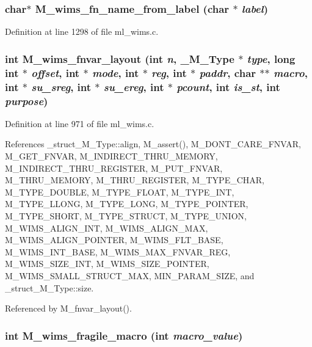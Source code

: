 \subsubsection{\setlength{\rightskip}{0pt plus 5cm}char$\ast$ M\_\-wims\_\-fn\_\-name\_\-from\_\-label (char $\ast$ {\em label})}\label{m__wims_8h_21169e6a1c9a19297104e104b42b11f3}




Definition at line 1298 of file ml\_\-wims.c.
\subsubsection{\setlength{\rightskip}{0pt plus 5cm}int M\_\-wims\_\-fnvar\_\-layout (int {\em n}, \bf{\_\-M\_\-Type} $\ast$ {\em type}, long int $\ast$ {\em offset}, int $\ast$ {\em mode}, int $\ast$ {\em reg}, int $\ast$ {\em paddr}, char $\ast$$\ast$ {\em macro}, int $\ast$ {\em su\_\-sreg}, int $\ast$ {\em su\_\-ereg}, int $\ast$ {\em pcount}, int {\em is\_\-st}, int {\em purpose})}\label{m__wims_8h_688045fdcb83e75df5f6b6af7a523cd5}




Definition at line 971 of file ml\_\-wims.c.

References \_\-struct\_\-M\_\-Type::align, M\_\-assert(), M\_\-DONT\_\-CARE\_\-FNVAR, M\_\-GET\_\-FNVAR, M\_\-INDIRECT\_\-THRU\_\-MEMORY, M\_\-INDIRECT\_\-THRU\_\-REGISTER, M\_\-PUT\_\-FNVAR, M\_\-THRU\_\-MEMORY, M\_\-THRU\_\-REGISTER, M\_\-TYPE\_\-CHAR, M\_\-TYPE\_\-DOUBLE, M\_\-TYPE\_\-FLOAT, M\_\-TYPE\_\-INT, M\_\-TYPE\_\-LLONG, M\_\-TYPE\_\-LONG, M\_\-TYPE\_\-POINTER, M\_\-TYPE\_\-SHORT, M\_\-TYPE\_\-STRUCT, M\_\-TYPE\_\-UNION, M\_\-WIMS\_\-ALIGN\_\-INT, M\_\-WIMS\_\-ALIGN\_\-MAX, M\_\-WIMS\_\-ALIGN\_\-POINTER, M\_\-WIMS\_\-FLT\_\-BASE, M\_\-WIMS\_\-INT\_\-BASE, M\_\-WIMS\_\-MAX\_\-FNVAR\_\-REG, M\_\-WIMS\_\-SIZE\_\-INT, M\_\-WIMS\_\-SIZE\_\-POINTER, M\_\-WIMS\_\-SMALL\_\-STRUCT\_\-MAX, MIN\_\-PARAM\_\-SIZE, and \_\-struct\_\-M\_\-Type::size.

Referenced by M\_\-fnvar\_\-layout().
\subsubsection{\setlength{\rightskip}{0pt plus 5cm}int M\_\-wims\_\-fragile\_\-macro (int {\em macro\_\-value})}\label{m__wims_8h_6ad7dec34a11d248caed4379d0475929}




